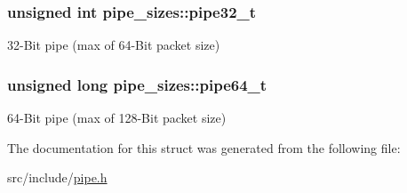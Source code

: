 \subsubsection[{pipe32\+\_\+t}]{\setlength{\rightskip}{0pt plus 5cm}unsigned int pipe\+\_\+sizes\+::pipe32\+\_\+t}\label{structpipe__sizes_a5e62f43829e6cc2027e8ebfcfde43fc2}
32-\/\+Bit pipe (max of 64-\/\+Bit packet size) \hypertarget{structpipe__sizes_a442e035eb8f5cbc6a674ca3737bd938f}{}
\subsubsection[{pipe64\+\_\+t}]{\setlength{\rightskip}{0pt plus 5cm}unsigned long pipe\+\_\+sizes\+::pipe64\+\_\+t}\label{structpipe__sizes_a442e035eb8f5cbc6a674ca3737bd938f}
64-\/\+Bit pipe (max of 128-\/\+Bit packet size) 

The documentation for this struct was generated from the following file\+:\begin{DoxyCompactItemize}
\item 
src/include/\hyperlink{pipe_8h}{pipe.\+h}\end{DoxyCompactItemize}

